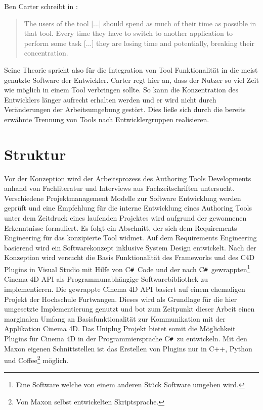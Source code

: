 \documentclass[pagesize, paper=a4, fontsize=12pt, titlepage=true, headings=small, headnosepline, abstractoff, liststotoc, nochapterprefix, plainheadsepline, twoside]{scrreprt}
\newcommand{\CSS}{C\texttt{\# }}
\begin{document}
Ben Carter schreibt in :
\begin{quote}
\glqq The users of the tool [...] should spend as much of their time as possible in that tool. Every time they have to switch to another application to perform some task [...] they are losing time and potentially, breaking their concentration. \grqq{} 
\end{quote}
Seine Theorie spricht also für die Integration von Tool Funktionalität in die meist genutzte Software der Entwickler. Carter regt hier an, dass der Nutzer so viel Zeit wie möglich in einem Tool verbringen sollte. So kann die Konzentration des Entwicklers länger aufrecht erhalten werden und er wird nicht durch Veränderungen der Arbeitsumgebung gestört. Dies ließe sich durch die bereits erwähnte Trennung von Tools nach Entwicklergruppen realisieren.

\section{Struktur}
Vor der Konzeption wird der Arbeitsprozess des Authoring Tools Developments anhand von Fachliteratur und Interviews aus Fachzeitschriften untersucht. Verschiedene Projektmanagement Modelle zur Software Entwicklung werden geprüft und eine Empfehlung für die interne Entwicklung eines Authoring Tools unter dem Zeitdruck eines laufenden Projektes wird aufgrund der gewonnenen Erkenntnisse formuliert. Es folgt ein Abschnitt, der sich dem Requirements Engineering für das konzipierte Tool widmet. Auf dem Requirements Engineering basierend wird ein Softwarekonzept inklusive System Design entwickelt. Nach der Konzeption wird versucht die Basis Funktionalität des Frameworks und des C4D Plugins in Visual Studio mit Hilfe von \CSS Code und der nach \CSS gewrappten\footnote{Eine Software welche von einem anderen Stück Software umgeben wird.} Cinema 4D API als Programmunabhängige Softwarebibliothek zu implementieren. Die gewrappte Cinema 4D API basiert auf einem ehemaligen Projekt der Hochschule Furtwangen. Dieses wird als Grundlage für die hier umgesetzte Implementierung genutzt und bot zum Zeitpunkt dieser Arbeit einen marginalen Umfang an Basisfunktionalität zur Kommunikation mit der Applikation Cinema 4D. Das Uniplug Projekt bietet somit die Möglichkeit Plugins für Cinema 4D in der Programmiersprache \CSS zu entwickeln. Mit den Maxon eigenen Schnittstellen ist das Erstellen von Plugins nur in C++, Python und Coffee\footnote{Von Maxon selbst entwickelten Skriptsprache.} möglich.
\end{document}
